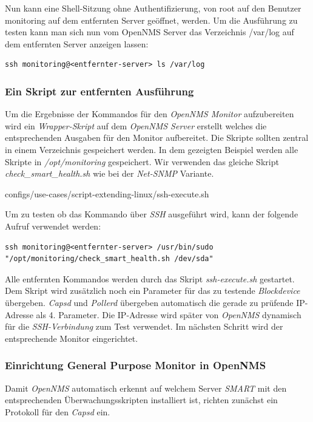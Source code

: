 Nun kann eine Shell-Sitzung ohne Authentifizierung, von root auf den Benutzer monitoring auf dem entfernten Server geöffnet, werden. Um die Ausführung zu testen kann man sich nun vom OpenNMS Server das Verzeichnis /var/log auf dem entfernten Server anzeigen lassen:

\begin{lstlisting}[numbers=none]
ssh monitoring@<entfernter-server> ls /var/log
\end{lstlisting}

\subsubsection{Ein Skript zur entfernten Ausführung}
Um die Ergebnisse der Kommandos für den \emph{OpenNMS Monitor} aufzubereiten wird ein \emph{Wrapper-Skript} auf dem \emph{OpenNMS Server} erstellt welches die entsprechenden Ausgaben für den Monitor aufbereitet. Die Skripte sollten zentral in einem Verzeichnis gespeichert werden. In dem gezeigten Beispiel werden alle Skripte in \emph{/opt/monitoring} gespeichert. Wir verwenden das gleiche Skript \emph{check\_smart\_health.sh} wie bei der \emph{Net-SNMP} Variante.


  {configs/use-cases/script-extending-linux/ssh-execute.sh}
  
Um zu testen ob das Kommando über \emph{SSH} ausgeführt wird, kann der folgende Aufruf verwendet werden:

\begin{lstlisting}[numbers=none]
ssh monitoring@<entfernter-server> /usr/bin/sudo "/opt/monitoring/check_smart_health.sh /dev/sda"
\end{lstlisting}

Alle entfernten Kommandos werden durch das Skript \emph{ssh-execute.sh} gestartet. Dem Skript wird zusätzlich noch ein Parameter für das zu testende \emph{Blockdevice} übergeben. \emph{Capsd} und \emph{Pollerd} übergeben automatisch die gerade zu prüfende IP-Adresse als 4. Parameter. Die IP-Adresse wird später von \emph{OpenNMS} dynamisch für die \emph{SSH-Verbindung} zum Test verwendet. Im nächsten Schritt wird der entsprechende Monitor eingerichtet.

\subsubsection{Einrichtung General Purpose Monitor in OpenNMS}
Damit \emph{OpenNMS} automatisch erkennt auf welchem Server \emph{SMART} mit den entsprechenden Überwachungsskripten installiert ist, richten zunächst ein Protokoll für den \emph{Capsd} ein. 

